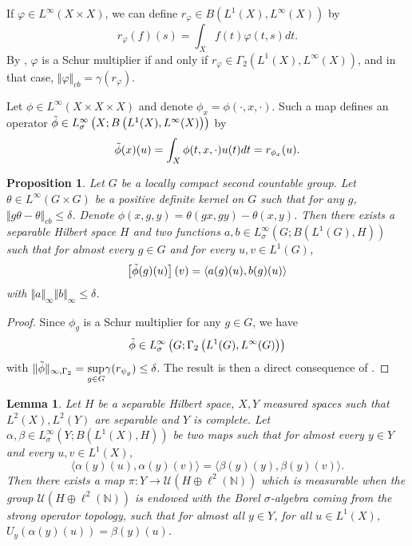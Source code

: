 \documentclass{article}
\newtheorem{lem}[theorem]{Lemma}
\newtheorem{prop}[theorem]{Proposition}
\theoremstyle{definition}
\theoremstyle{remark}
\numberwithin{equation}{section}
\newcommand{\N}{\mathbb{N}}
\begin{document}
 If $\varphi\in L^\infty(X\times X)$, we can define $r_\varphi\in B\left(L^1(X),L^\infty(X)\right)$ by $$r_\varphi(f)(s)=\int_X f(t)\varphi(t,s)dt.$$
 By \cite[Thm. 3.3]{spronk}, $\varphi$ is a Schur multiplier if and only if $r_\varphi\in \Gamma_2\left(L^1(X),L^\infty(X)\right)$, and in that case, $\Vert \varphi\Vert_{cb}=\gamma(r_\varphi)$.\medskip

 Let $\phi\in L^\infty(X\times X\times X)$ and denote $\phi_x=\phi(\cdot,x,\cdot)$. Such a map defines an operator $\Tilde{\phi}\in L^\infty_\sigma\left(X;B\left(L^1(X),L^\infty(X)\right)\right)$ by $$\Tilde{\phi}(x)(u)=\int_X \phi(t,x,\cdot)u(t)dt=r_{\phi_x}(u).$$
\begin{prop}\label{prop:factorisation}
    Let $G$ be a locally compact second countable group. Let $\theta\in L^{\infty}(G\times G)$ be a positive definite kernel on $G$ such that for any $g$, $\Vert g\theta-\theta\Vert_{cb}\leq \delta$. Denote $\phi(x,g,y)=\theta(gx,gy)-\theta(x,y)$. Then there exists a separable Hilbert space $H$ and two functions $a,b\in L^\infty_\sigma\left(G;B\left(L^1(G),H\right)\right)$ such that for almost every $g\in G$ and for every $u,v\in L^1(G)$, $$\left[\Tilde{\phi}(g)(u)\right](v)=\langle a(g)(u),b(g)(u)\rangle$$ with $\Vert a\Vert_\infty \Vert b\Vert_\infty\leq \delta$.
\end{prop}

\begin{proof}
    Since $\phi_g$ is a Schur multiplier for any $g\in G$, we have $$\Tilde{\phi}\in L^\infty_\sigma\left(G;\Gamma_2\left(L^1(G),L^\infty(G)\right)\right)$$with $\Vert \Tilde{\phi}\Vert_{\infty,\Gamma_2}=\underset{g\in G}{\sup} \gamma(r_{\psi_{g}})\leq \delta$.
   The result is then a direct consequence of \cite[Thm 5.1]{coine}.\qedhere

    
\end{proof}




\begin{lem}\label{lem:unitarymeas}
 Let $H$ be a separable Hilbert space, $X,Y$ measured spaces such that $L^2(X),L^2(Y)$ are separable and $Y$ is complete. Let $\alpha,\beta\in L^\infty_\sigma\left(Y;B\left(L^1(X),H\right)\right)$ be two maps such that for almost every $y\in Y$ and every $u,v\in L^1(X)$, \begin{equation}
     \label{eq:hypogeom}\langle \alpha(y)(u),\alpha(y)(v)\rangle=\langle \beta(y)(y),\beta(y)(v)\rangle.
 \end{equation}Then there exists a map $\pi:Y\to \mathcal{U}\left(H\oplus \ell^2(\N)\right)$ which is measurable when the group $\mathcal{U}(H\oplus \ell^2(\N))$ is endowed with the Borel $\sigma$-algebra coming from the strong operator topology, such that for almost all $y\in Y$, for all $u\in L^1(X)$, $U_y\left(\alpha(y)(u)\right)=\beta(y)(u)$.
\end{lem}
\end{document}
